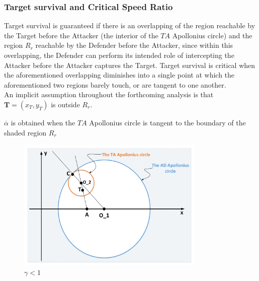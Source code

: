 \documentclass{beamer}
\begin{document}
\begin{frame}
\frametitle{Target survival and Critical Speed Ratio}
Target survival is guaranteed if there is an overlapping of the region reachable by the Target before the Attacker (the interior of the $TA$ Apollonius circle) and the region $R_r$ reachable by the Defender before the Attacker, since within this overlapping, the Defender can perform its intended role of intercepting the Attacker before the Attacker captures the Target. Target survival is critical when the aforementioned overlapping diminishes into a single point at which the aforementioned two regions barely touch, or are tangent to one another.\\

 An implicit assumption throughout the forthcoming analysis is that $\boldsymbol{T}=(x_T , y_T)$ is outside $R_r$. 
\end{frame}

\begin{frame}
$\overline{\alpha}$ is obtained when the $TA$ Apollonius circle is tangent to the boundary of the shaded region $R_r$

\centering
\begin{figure}
\includegraphics[width=0.8\textwidth]{fig/drawing4_2a.pdf}
\caption {$\gamma<1$}
\label{4_g<1}
\end{figure}
\end{frame}
\end{document}
